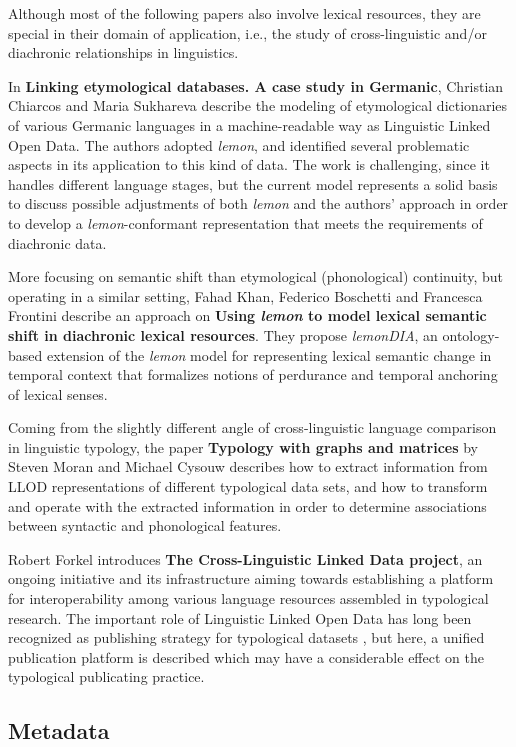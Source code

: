 Although most of the following papers also involve lexical resources, they are special in their domain of application, i.e., the study of cross-linguistic and/or diachronic relationships in linguistics.

	In \textbf{Linking etymological databases. A case study in Germanic}, Christian Chiarcos and Maria Sukhareva
	describe the modeling of etymological dictionaries of various Germanic languages in a machine-readable way as Linguistic Linked Open Data. 
	The authors adopted \emph{lemon}, and identified several problematic aspects in its application to this kind of data.
	The work is challenging, since it handles different language stages, but the current model represents a solid basis to discuss possible adjustments of both \emph{lemon} and the authors' approach in order to develop a \emph{lemon}-conformant representation that meets the requirements of diachronic data.
		
	More focusing on semantic shift than etymological (phonological) continuity, but operating in a similar setting, 
	Fahad Khan, Federico Boschetti and Francesca Frontini describe an approach on \textbf{Using \emph{lemon} to model lexical semantic shift in diachronic lexical resources}. 
	They propose \emph{lemonDIA}, an ontology-based extension of the \emph{lemon} model for representing lexical semantic change in temporal context that formalizes notions of perdurance and temporal anchoring of lexical senses. 

	Coming from the slightly different angle of cross-linguistic language comparison in linguistic typology, the paper 
	\textbf{Typology with graphs and matrices} by Steven Moran and Michael Cysouw describes how to extract information from LLOD representations of different typological data sets, and how to transform and operate with the extracted information in order to determine associations between syntactic and phonological features.

	Robert Forkel introduces \textbf{The Cross-Linguistic Linked Data project},
	an ongoing initiative and its infrastructure aiming towards establishing a platform 
	for interoperability among various language resources assembled in typological research. 
	The important role of Linguistic Linked Open Data has long been recognized as publishing strategy for 
	typological datasets \citep{ldl2012}, but here, a unified 
	publication platform is described which may have a considerable effect on the typological publicating practice.
	
\subsection{Metadata}

